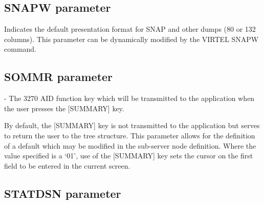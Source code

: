 \documentclass[letterpaper,10pt,english]{sphinxmanual}
\begin{document}

\subsection{SNAPW parameter}
\label{\detokenize{Installation_Guide:index-115}}\label{\detokenize{Installation_Guide:snapw-parameter}}
\begin{sphinxVerbatim}[commandchars=\\\{\}]
 
\end{sphinxVerbatim}

Indicates the default presentation format for SNAP and other dumps (80 or 132 columns). This parameter can be dynamically modified by the VIRTEL SNAPW command.


\subsection{SOMMR parameter}
\label{\detokenize{Installation_Guide:sommr-parameter}}
\begin{sphinxVerbatim}[commandchars=\\\{\}]
 
\end{sphinxVerbatim}

 - The 3270 AID function key which will be transmitted to the application when the user presses the {[}SUMMARY{]} key.

By default, the {[}SUMMARY{]} key is not transmitted to the application but serves to return the user to the tree structure. This parameter allows for the definition of a default which may be modified in the sub-server node definition. Where the value specified is a ‘01’, use of the {[}SUMMARY{]} key sets the cursor on the first field to be entered in the current screen.


\subsection{STATDSN parameter}
\label{\detokenize{Installation_Guide:index-116}}\label{\detokenize{Installation_Guide:statdsn-parameter}}
\begin{sphinxVerbatim}[commandchars=\\\{\}]
 
\end{sphinxVerbatim}
\end{document}
